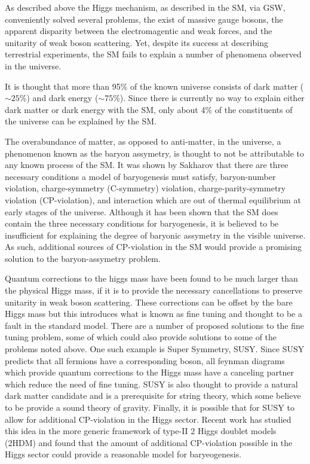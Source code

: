 As described above the Higgs mechanism, as described in the SM, via GSW, 
conveniently solved several problems, the exist of massive gauge bosons,
the apparent disparity between the electromagentic and weak forces, and 
the unitarity of weak boson scattering. Yet, despite its success at 
describing terrestrial experiments, the SM fails 
to explain a number of phenomena observed in the universe.
  
It is thought that more than 95\% of the known universe consists of dark 
matter ($\sim25$\%) and dark energy ($\sim75$\%)\cite{??}.  Since there is 
currently no way to explain either dark matter or dark energy with the SM, 
only about 4\% of the constituents of the universe can be explained by the 
SM.  

The overabundance of matter, as opposed to anti-matter, in the 
universe, a phenomenon known as the baryon assymetry, is thought to not be 
attributable to any known process of the SM.
It was shown by Sakharov\cite{??} that there are three necessary conditions 
a model of baryogenesis must satisfy, baryon-number violation, 
charge-symmetry (C-symmetry) violation, charge-parity-symmetry violation 
(CP-violation), and interaction which are out of thermal equilibrium at early
stages of the universe.  Although it has been shown that the SM does
contain the three necessary conditions for baryogenesis, it is believed
to be insufficient for explaining the degree of baryonic assymetry in the 
visible universe.  As such, additional sources of CP-violation in the SM 
would provide a promising solution to the baryon-assymetry problem.  

Quantum corrections to the higgs mass have been found to be much 
larger than the physical Higgs mass, if it is to provide the necessary   
cancellations to preserve unitarity in weak boson scattering.  These 
corrections can be offset by the bare Higgs mass but this introduces
what is known as fine tuning and thought to be a fault in the standard
model.  There are a number of proposed solutions to the fine tuning 
problem, some of which could also provide solutions to some of the 
problems noted above.  One such example is Super Symmetry, SUSY.  
Since SUSY predicts that all fermions have a corresponding boson, 
all feynman diagrams which provide quantum corrections to the Higgs 
mass have a canceling partner which reduce the need of fine tuning. 
SUSY is also thought to provide a natural dark matter candidate and
is a prerequisite for string theory, which some believe to be provide
a sound theory of gravity.  Finally, it is possible that for SUSY 
to allow for additional CP-violation in the Higgs sector.  Recent work
has studied this idea in the more generic framework of type-II 2 Higgs
doublet models (2HDM) and found that the amount of additional CP-violation
possible in the Higgs sector could provide a reasonable model for 
baryeogenesis.  

